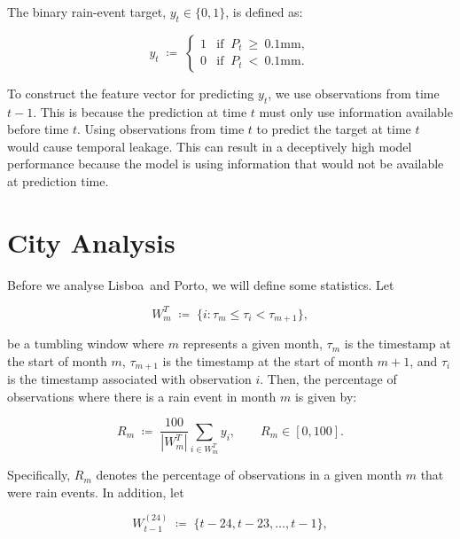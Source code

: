 \documentclass[11pt,a4paper]{article}
\newcommand{\CityA}{Lisboa}
\newcommand{\CityB}{Porto}
\begin{document}
	The binary rain-event target, $y_t \in \{0, 1\}$, is defined as:
	
	\begin{equation}
		\label{eq:rain-event}
		y_t \;\coloneqq\; \begin{cases}
			1 & \text{if} \;\; P_t \:\ge\: 0.1\mathrm{mm}, \\
			0 & \text{if} \;\; P_t \:<\: 0.1\mathrm{mm}.
		\end{cases}
	\end{equation}
	
	To construct the feature vector for predicting $y_t$, we use observations from time $t-1$. This is because the prediction at time $t$ must only use information available before time $t$. Using observations from time $t$ to predict the target at time $t$ would cause temporal leakage. This can result in a deceptively high model performance because the model is using information that would not be available at prediction time.
	
	\section{City Analysis}
	Before we analyse \CityA\ and \CityB, we will define some statistics. Let
	
	\begin{equation}
		W^T_m \;\coloneqq\; \{ i : \tau_m \le \tau_i < \tau_{m+1} \},
	\end{equation}
	
	be a tumbling window where $m$ represents a given month, $\tau_m$ is the timestamp at the start of month $m$, $\tau_{m+1}$ is the timestamp at the start of month $m+1$, and $\tau_i$ is the timestamp associated with observation $i$. Then, the percentage of observations where there is a rain event in month $m$ is given by:
	
	\begin{equation}
		\label{eq:R_m}
		R_m \;\coloneqq\; \frac{100}{\left\lvert W^T_m \right\rvert} \sum_{i \in W^T_m} y_i, \qquad R_m \in [0, 100].
	\end{equation}
	
	Specifically, $R_m$ denotes the percentage of observations in a given month $m$ that were rain events. In addition, let
	
	\begin{equation}
		W^{(24)}_{t-1} \;\coloneqq\; \{t-24, t-23, \dotsc, t-1\},
	\end{equation}
	
\end{document}
